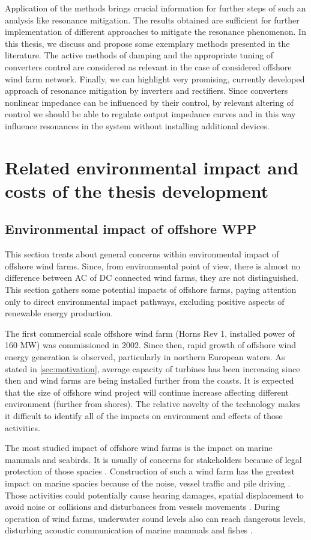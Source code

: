 \documentclass[a4paper,11pt,twoside]{report} %
\begin{document}
Application of the methods brings crucial information for further steps of such an analysis like resonance mitigation. The results obtained are sufficient for further implementation of different approaches to mitigate the resonance phenomenon. In this thesis, we discuss and propose some exemplary methods presented in the literature. The active methods of damping and the appropriate tuning of converters control are considered as relevant in the case of considered offshore wind farm network. Finally, we can highlight very promising, currently developed approach of resonance mitigation by inverters and rectifiers. Since converters nonlinear impedance can be influenced by their control, by relevant altering of control we should be able to regulate output impedance curves and in this way influence resonances in the system without installing additional devices.

\chapter{Related environmental impact and costs of the thesis development}
\section{Environmental impact of offshore WPP}
This section treats about general concerns within environmental impact of offshore wind farms. Since, from environmental point of view, there is almost no difference between AC of DC connected wind farms, they are not distinguished. This section gathers some potential impacts of offshore farms, paying attention only to direct environmental impact pathways, excluding positive aspects of renewable energy production.

The first commercial scale offshore wind farm (Horns Rev 1, installed power of 160 MW) was commissioned in 2002. Since then, rapid growth of offshore wind energy generation is observed, particularly in northern European waters. As stated in \ref{sec:motivation}, average capacity of turbines has been increasing since then and wind farms are being installed further from the coasts. It is expected that the size of offshore wind project will continue increase \cite{offshorestat2014} affecting different environment (further from shores). The relative novelty of the technology makes it difficult to identify all of the impacts on environment and effects of those activities.

The most studied impact of offshore wind farms is the impact on marine mammals and seabirds. It is usually of concerns for stakeholders because of legal protection of those spacies \cite{bailey2014}. Construction of such a wind farm has the greatest impact on marine spacies because of the noise, vessel traffic and pile driving \cite{dolman2010}. Those activities could potentially cause hearing damages, spatial displacement to avoid noise or collisions and disturbances from vessels movements \cite{madsen2006}.  During operation of wind farms, underwater sound levels also can reach dangerous levels, disturbing acoustic communication of marine mammals \cite{tougaard2009} and fishes \cite{wahlberg2005}. 
\end{document}
